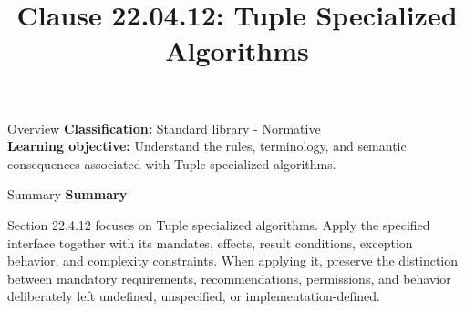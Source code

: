 \documentclass[10pt,letterpaper]{article}
\title{Clause 22.04.12: Tuple Specialized Algorithms}
\author{}
\date{}
\begin{document}
\maketitle
\begin{CornellOverviewBox}{Overview}
\textbf{Classification:} Standard library - Normative\\[2pt]
\textbf{Learning objective:} Understand the rules, terminology, and semantic consequences associated with Tuple specialized algorithms.
\end{CornellOverviewBox}\begin{CornellSummaryBox}{Summary}
{\sffamily\bfseries\color{Accent} Summary}\par\vspace{3pt}Section 22.4.12 focuses on Tuple specialized algorithms. Apply the specified interface together with its mandates, effects, result conditions, exception behavior, and complexity constraints. When applying it, preserve the distinction between mandatory requirements, recommendations, permissions, and behavior deliberately left undefined, unspecified, or implementation-defined.
\end{CornellSummaryBox}
\end{document}
